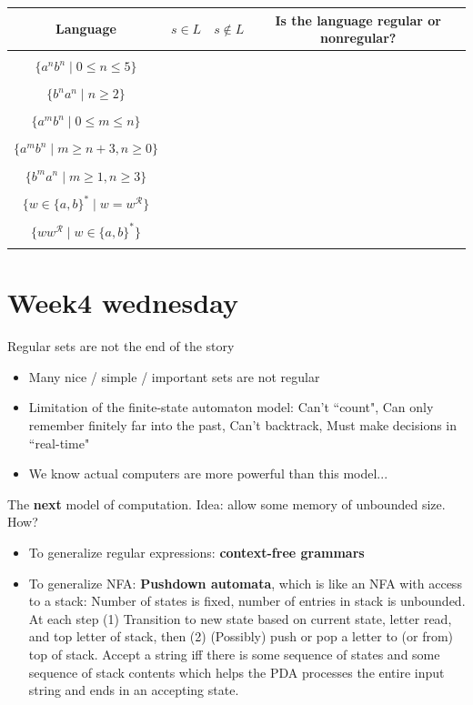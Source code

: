 \documentclass[12pt, oneside]{article}
\begin{document}
\begin{center}
    \begin{tabular}{c|c| c| c}
    Language & $s \in L$ & $s \notin L$ & Is the language regular or nonregular?  \\
    \hline
     & \hspace{1in} & \hspace{1in}  &  \\
    $\{a^nb^n \mid 0  \leq n  \leq 5 \}$ & & & \\
     & & & \\
    $\{b^n a^n \mid  n  \geq 2\}$  & & & \\
     & & & \\
    $\{a^m b^n \mid  0 \leq m\leq n\}$  & & & \\
     & & & \\
    $\{a^m b^n \mid  m \geq n+3,  n \geq 0\}$  & & & \\
     & & & \\
    $\{b^m a^n \mid  m \geq 1, n \geq  3\}$  & & & \\
     & & & \\
    $\{ w  \in \{a,b\}^* \mid w = w^\mathcal{R} \}$ & & & \\
     & & & \\ 
    $\{ ww^\mathcal{R} \mid w\in \{a,b\}^* \}$ & & & \\
     & & & \\ 
    \end{tabular}
\end{center}
     \vfill
\section*{Week4 wednesday}


Regular sets are not the end of the story
\begin{itemize}
    \item Many nice / simple / important sets are not regular
    \item Limitation of the finite-state automaton model: Can't ``count", Can only remember finitely far into the past,
    Can't backtrack, Must make decisions in ``real-time"
    \item We know actual computers are more powerful than this model...
\end{itemize}

The {\bf next} model of computation. Idea: allow some memory of unbounded size. How? 
\begin{itemize}
    \item To generalize regular expressions: {\bf context-free grammars}\\
    \item To generalize NFA: {\bf Pushdown automata}, which is like an NFA with access to a stack: 
    Number of states is fixed, number of entries in stack is unbounded. At each step
    (1) Transition to new state based on current state, letter read, and top letter of stack, then
    (2) (Possibly) push or pop a letter to (or from) top of stack. Accept a string iff
    there is some sequence of states and some sequence of stack contents 
    which helps the PDA processes the entire input string and ends in an accepting state.
\end{itemize}
\end{document}
